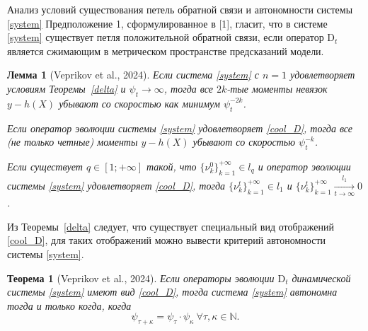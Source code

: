 \documentclass[aspectratio=169]{beamer}
\newtheorem{theorem_rus}{Теорема}
\newtheorem{lemma_rus}{Лемма}
\begin{document}
    \begin{frame}{Анализ условий существования петель обратной связи и автономности системы \eqref{system}}
    \footnotesize
        \vspace{-1mm}
        Предположение 1, сформулированное в [1], гласит, что в системе \eqref{system} существует петля положительной обратной связи, если оператор $\text{D}_t$ является сжимающим в метрическом пространстве предсказаний модели.
        \vspace{-2mm}
        \begin{lemma_rus}[Veprikov et al., 2024] \label{moments}
        \vspace{-3mm}
            Если система \eqref{system} с $n=1$ удовлетворяет условиям Теоремы~\ref{delta} и $\psi_t \to \infty$, тогда все $2k$-тые моменты невязок 
            $y - h(X)$ убывают со скоростью как минимум $\psi_t^{-2k}$.
    
            Если оператор эволюции системы \eqref{system} удовлетворяет \eqref{cool_D}, тогда все (не только четные) моменты 
            $y - h(X)$ убывают со скоростью $\psi_t^{-k}$.
    
            Если существует $q \in [1; +\infty]$ такой, что $\{\nu_k^0\}_{k=1}^{+\infty} \in l_q$ и оператор эволюции системы \eqref{system} удовлетворяет \eqref{cool_D}, тогда $\{\nu_k^t\}_{k=1}^{+\infty} \in l_1$ и $\{\nu_k^t\}_{k=1}^{+\infty} \underset{t \to \infty}{\overset{l_1}{\longrightarrow}} 0$.
        \end{lemma_rus}
        Из Теоремы~\ref{delta} следует, что существует специальный вид отображений \eqref{cool_D}, для таких отображений можно вывести критерий автономности системы \eqref{system}.
        \vspace{-2mm}
        \begin{theorem_rus}[Veprikov et al., 2024] \label{semigroup}
        \vspace{-3mm}
            Если операторы эволюции $\text{D}_t$ динамической системы \eqref{system} имеют вид \eqref{cool_D}, тогда система \eqref{system} автономна тогда и только когда, когда
            \begin{equation} \label{cond_semigroup}
                \psi_{\tau + \kappa} = \psi_{\tau} \cdot \psi_{\kappa} ~\forall \tau, \kappa \in \mathbb{N}.
            \end{equation}
        \end{theorem_rus}
        
    \end{frame}
    
\end{document}
